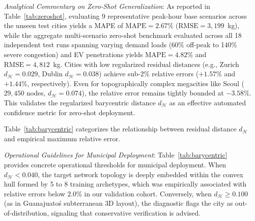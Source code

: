 \documentclass[journal]{IEEEtran}
\begin{document}
\textit{Analytical Commentary on Zero-Shot Generalization}:
As reported in Table~\ref{tab:zeroshot}, evaluating 9 representative peak-hour base scenarios across the unseen test cities yields a MAPE of $\text{MAPE} = 2.67\%$ ($\text{RMSE} = 3,199$~kg), while the aggregate multi-scenario zero-shot benchmark evaluated across all 18 independent test runs spanning varying demand loads (60\% off-peak to 140\% severe congestion) and EV penetrations yields $\text{MAPE} = 4.82\%$ and $\text{RMSE} = 4,812$~kg. Cities with low regularized residual distances (e.g., Zurich $d_{\mathcal{H}} = 0.029$, Dublin $d_{\mathcal{H}} = 0.038$) achieve sub-$2\%$ relative errors ($+1.57\%$ and $+1.44\%$, respectively). Even for topographically complex megacities like Seoul ($29,450$ nodes, $d_{\mathcal{H}} = 0.074$), the relative error remains tightly bounded at $-3.58\%$. This validates the regularized barycentric distance $d_{\mathcal{H}}$ as an effective automated confidence metric for zero-shot deployment.

Table~\ref{tab:barycentric} categorizes the relationship between residual distance $d_{\mathcal{H}}$ and empirical maximum relative error.

\begin{table}[htbp]
\caption{Regularized Barycentric Reconstruction Residual vs. Prediction Error Range}
\label{tab:barycentric}
\centering
{}
\end{table}

\textit{Operational Guidelines for Municipal Deployment}:
Table~\ref{tab:barycentric} provides concrete operational thresholds for municipal deployment. When $d_{\mathcal{H}} < 0.040$, the target network topology is deeply embedded within the convex hull formed by 5 to 8 training archetypes, which was empirically associated with relative errors below $2.0\%$ in our validation cohort. Conversely, when $d_{\mathcal{H}} \ge 0.100$ (as in Guanajuato\'s subterranean 3D layout), the diagnostic flags the city as out-of-distribution, signaling that conservative verification is advised.
\end{document}
